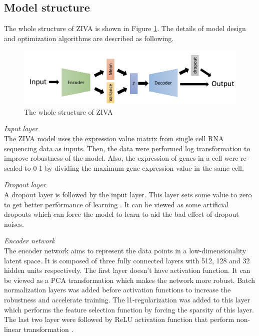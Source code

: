 \subsection{Model structure}
The whole structure of ZIVA is shown in Figure \ref{modelstru}. The details of model design and optimization algorithms are described as following. 
\begin{figure}
    \centering
    \includegraphics[width=1\textwidth]{figures/myfigures/ZIVA.png}
    \caption{The whole structure of ZIVA}
    \label{modelstru}
\end{figure}

\vspace{0.5cm}
\noindent\emph{Input layer} \\ The ZIVA model uses the expression value matrix from single cell RNA sequencing data as inputs. Then, the data were performed log transformation to improve robustness of the model.  Also, the expression of genes in a cell were re-scaled to 0-1 by dividing the maximum gene expression value in the same cell. 

\vspace{0.5cm}
\noindent\emph{Dropout layer} \\ A dropout layer \cite{baldi2013understanding} is followed by the input layer. This layer sets some value to zero to get better performance of learning \cite{vincent2008extracting}. It can be viewed as some artificial dropouts which can force the model to learn to aid the bad effect of dropout noises. 

\vspace{0.5cm}
\noindent\emph{Encoder network} \\
The encoder network aims to represent the data points in a low-dimensionality latent space. It is composed of three fully connected layers with 512, 128 and 32 hidden units respectively. The first layer doesn’t have activation function. It can be viewed as a PCA transformation which makes the network more robust. Batch normalization \cite{ioffe2015batch} layers was added before activation functions to increase the robustness and accelerate training. The l1-regularization was added to this layer which performs the feature selection function by forcing the sparsity of this layer. The last two layer were followed by ReLU activation function that perform non-linear transformation \cite{krizhevsky2012imagenet}.


